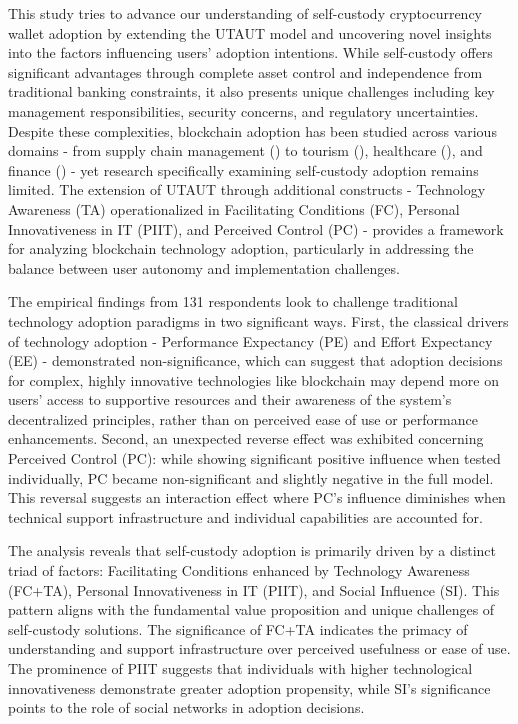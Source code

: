 \documentclass[twocolumn]{article}
\begin{document}
This study tries to advance our understanding of self-custody cryptocurrency wallet adoption by extending the UTAUT model and uncovering novel insights into the factors influencing users' adoption intentions. While self-custody offers significant advantages through complete asset control and independence from traditional banking constraints, it also presents unique challenges including key management responsibilities, security concerns, and regulatory uncertainties. Despite these complexities, blockchain adoption has been studied across various domains - from supply chain management (\cite{queiroz_blockchain_2019}) to tourism (\cite{radic_you_2022}), healthcare (\cite{baltruschat_user_2023}), and finance (\cite{kumari_impact_2022}) - yet research specifically examining self-custody adoption remains limited. The extension of UTAUT through additional constructs - Technology Awareness (TA) operationalized in Facilitating Conditions (FC), Personal Innovativeness in IT (PIIT), and Perceived Control (PC) - provides a framework for analyzing blockchain technology adoption, particularly in addressing the balance between user autonomy and implementation challenges.

The empirical findings from 131 respondents look to challenge traditional technology adoption paradigms in two significant ways. First, the classical drivers of technology adoption - Performance Expectancy (PE) and Effort Expectancy (EE) - demonstrated non-significance, which can suggest that adoption decisions for complex, highly innovative technologies like blockchain may depend more on users’ access to supportive resources and their awareness of the system's decentralized principles, rather than on perceived ease of use or performance enhancements. Second, an unexpected reverse effect was exhibited concerning Perceived Control (PC): while showing significant positive influence when tested individually, PC became non-significant and slightly negative in the full model. This reversal suggests an interaction effect where PC's influence diminishes when technical support infrastructure and individual capabilities are accounted for.

The analysis reveals that self-custody adoption is primarily driven by a distinct triad of factors: Facilitating Conditions enhanced by Technology Awareness (FC+TA), Personal Innovativeness in IT (PIIT), and Social Influence (SI). This pattern aligns with the fundamental value proposition and unique challenges of self-custody solutions. The significance of FC+TA indicates the primacy of understanding and support infrastructure over perceived usefulness or ease of use. The prominence of PIIT suggests that individuals with higher technological innovativeness demonstrate greater adoption propensity, while SI's significance points to the role of social networks in adoption decisions.
\end{document}
